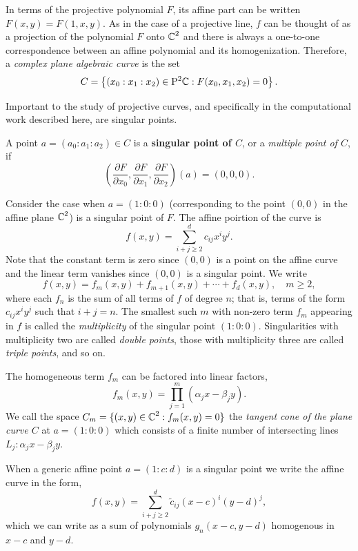 In terms of the projective polynomial $F$, its affine part can be written
$F(x,y) = F(1,x,y)$. As in the case of a projective line, $f$ can be thought of
as a projection of the polynomial $F$ onto $\operatorname{\mathbb{C}}^2$ and there is always a
one-to-one correspondence between an affine polynomial and its homogenization.
Therefore, a {\it complex plane algebraic curve} is the set
\[
  C = \left\{ (x_0 : x_1 : x_2) \in \mathrm{P}^2 \!\operatorname{\mathbb{C}} : F(x_0,x_1,x_2) = 0 \right\}.
\]

Important to the study of projective curves, and specifically in the
computational work described here, are singular points.
\begin{definition} \label{def: singular-point} A point $a = (a_0 : a_1 : a_2)
  \in C$ is a {\bf singular point of $C$}, or a {\it multiple point of $C$}, if
  \[
    \left( \frac{\partial F}{\partial x_0},
      \frac{\partial F}{\partial x_1},
      \frac{\partial F}{\partial x_2} \right) (a) = (0,0,0).
  \]
\end{definition}
Consider the case when $a = (1 : 0 : 0)$ (corresponding to the point $(0,0)$ in
the affine plane $\operatorname{\mathbb{C}}^2$) is a singular point of $F$. The affine poirtion of the
curve is
\[
  f(x,y) = \sum_{i+j \geq 2}^d c_{ij} x^iy^j.
\]
Note that the constant term is zero since $(0, 0)$ is a point on the affine
curve and the linear term vanishes since $(0,0)$ is a singular point. We write
\[
  f(x,y) = f_m(x,y) + f_{m+1}(x,y) + \cdots + f_d(x,y), \quad m \geq 2,
\]
where each $f_n$ is the sum of all terms of $f$ of degree $n$; that is, terms of
the form $c_{ij}x^iy^j$ such that $i+j=n$. The smallest such $m$ with non-zero
term $f_m$ appearing in $f$ is called the {\it multiplicity} of the singular
point $(1 : 0 : 0)$. Singularities with multiplicity two are called {\it double
  points}, those with multiplicity three are called {\it triple points}, and so
on.

The homogeneous term $f_m$ can be factored into linear factors,
\[
  f_m(x,y) = \prod_{j=1}^m (\alpha_j x - \beta_j y).
\]
We call the space $C_m = \{(x,y) \in \operatorname{\mathbb{C}}^2 : f_m(x,y) = 0\}$ the {\it tangent
  cone of the plane curve $C$} at $a = (1 : 0 : 0)$ which consists of a finite
number of intersecting lines $L_j : \alpha_j x - \beta_j y$.

When a generic affine point $a = (1 : c : d)$ is a singular point we write the
affine curve in the form,
\[
  f(x,y) = \sum_{i+j \geq 2}^d \tilde{c}_{ij} (x-c)^i(y-d)^j,
\]
which we can write as a sum of polynomials $g_n(x-c,y-d)$ homogenous in $x-c$
and $y-d$.

